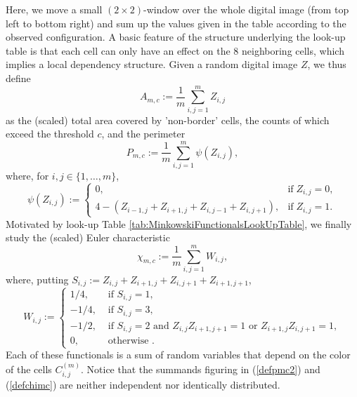 \documentclass[12pt]{article}
\begin{document}
Here, we move a small $(2\times 2)$-window over the whole digital image (from top left to bottom right) and sum up the values given in the table according to the observed configuration. A basic feature of the structure underlying the look-up table is that each cell can only have an effect on the 8 neighboring cells, which implies a local dependency structure. Given a random digital image $Z$, we thus define
\begin{equation}\label{defamc}
A_{m,c}:=\frac{1}{m}\sum_{i,j=1}^mZ_{i,j}
\end{equation}
as the (scaled) total area covered by 'non-border' cells, the counts of which exceed the threshold $c$, and the perimeter
\begin{equation}\label{defpmc2}
P_{m,c}:=\frac{1}{m}\sum_{i,j=1}^m\psi(Z_{i,j}),
\end{equation}
where, for $i,j\in\{1,\ldots,m\}$,
\begin{equation*}
\psi(Z_{i,j}):=\left\{\begin{array}{cc} 0, & \mbox{if}\;Z_{i,j}=0,\\ 4-(Z_{i-1,j}+Z_{i+1,j}+Z_{i,j-1}+Z_{i,j+1}), & \mbox{if}\;Z_{i,j}=1.\end{array}\right.
\end{equation*}
Motivated by look-up Table \ref{tab:MinkowskiFunctionalsLookUpTable}, we finally study the (scaled) Euler characteristic
\begin{equation}\label{defchimc}
\chi_{m,c}:= \frac{1}{m} \sum_{i,j=1}^{m}W_{i,j},
\end{equation}
where, putting $S_{i,j} := Z_{i,j} + Z_{i+1,j} + Z_{i,j+1}+ Z_{i+1,j+1}$,
\begin{equation} \label{defwij}
W_{i,j} := \left\{\begin{array}{ll}
1/4, & \text{ if } S_{i,j} = 1,\\
-1/4, & \text{ if } S_{i,j} = 3,\\
-1/2, & \text{ if } S_{i,j} = 2 \text{ and }  Z_{i,j}Z_{i+1,j+1} = 1 \text{ or } Z_{i+1,j}Z_{i,j+1} = 1,\\
0, & \text{ otherwise }.
\end{array}\right.
\end{equation}
Each of these functionals is a sum of random variables that depend on the color of the cells $C_{i,j}^{(m)}$. Notice that the summands figuring in (\ref{defpmc2}) and (\ref{defchimc}) are neither independent nor identically distributed.
\end{document}
